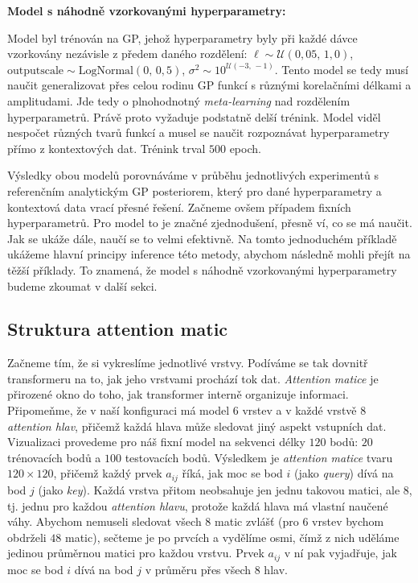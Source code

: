 \textbf{Model s náhodně vzorkovanými hyperparametry:} 

Model byl trénován na GP, jehož hyperparametry byly při každé dávce vzorkovány nezávisle z předem daného rozdělení: $\ell \sim \mathcal{U}(0{,}05,\, 1{,}0)$, $\text{outputscale} \sim \text{LogNormal}(0,\, 0{,}5)$, $\sigma^2 \sim 10^{\mathcal{U}(-3,\,-1)}$.
Tento model se tedy musí naučit generalizovat přes celou rodinu GP funkcí s různými korelačními délkami a amplitudami.
Jde tedy o plnohodnotný \emph{meta-learning} nad rozdělením hyperparametrů.
Právě proto vyžaduje podstatně delší trénink.
Model viděl nespočet různých tvarů funkcí a musel se naučit rozpoznávat hyperparametry přímo z kontextových dat.
Trénink trval $500$ epoch.
\par

Výsledky obou modelů porovnáváme v průběhu jednotlivých experimentů s referenčním analytickým GP posteriorem, který pro dané hyperparametry a kontextová data vrací přesné řešení.
Začneme ovšem případem fixních hyperparametrů.
Pro model to je značné zjednodušení, přesně ví, co se má naučit.
Jak se ukáže dále, naučí se to velmi efektivně.
Na tomto jednoduchém příkladě ukážeme hlavní principy inference této metody, abychom následně mohli přejít na těžší příklady.
To znamená, že model s náhodně vzorkovanými hyperparametry budeme zkoumat v další sekci. 
\par

\subsection{Struktura attention matic}
\label{subsec:struktura-attention}

Začneme tím, že si vykreslíme jednotlivé vrstvy.
Podíváme se tak dovnitř transformeru na to, jak jeho vrstvami prochází tok dat.
\emph{Attention matice} je přirozené okno do toho, jak transformer interně organizuje informaci.
Připomeňme, že v naší konfiguraci má model $6$ vrstev a v každé vrstvě $8$ \emph{attention hlav}, přičemž každá hlava může sledovat jiný aspekt vstupních dat.
Vizualizaci provedeme pro náš fixní model na sekvenci délky $120$ bodů: $20$ trénovacích bodů a $100$ testovacích bodů.
Výsledkem je \emph{attention matice} tvaru $120 \times 120$, přičemž každý prvek $a_{ij}$ říká, jak moc se bod $i$ (jako \textit{query}) dívá na bod $j$ (jako \textit{key}).
Každá vrstva přitom neobsahuje jen jednu takovou matici, ale $8$, tj. jednu pro každou \emph{attention hlavu}, protože každá hlava má vlastní naučené váhy.
Abychom nemuseli sledovat všech $8$ matic zvlášť (pro $6$ vrstev bychom obdrželi $48$ matic), sečteme je po prvcích a vydělíme osmi, čímž z nich uděláme jedinou průměrnou matici pro každou vrstvu.
Prvek $a_{ij}$ v ní pak vyjadřuje, jak moc se bod $i$ dívá na bod $j$ v průměru přes všech $8$ hlav.

